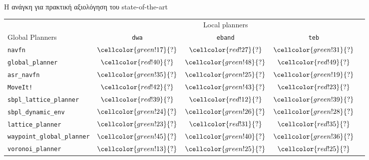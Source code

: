 \begin{frame}{Η ανάγκη για πρακτική αξιολόγηση του state-of-the-art}
{\footnotesize
\begin{table}[h]
\begin{tabular}{lcccc}
  & \multicolumn{3}{c}{Local planners} \\
  \cline{2-4}
  Global Planners                     & \texttt{dwa}                               & \texttt{eband}                             & \texttt{teb} \\ \toprule
  \texttt{navfn}                     & $\cellcolor{green!17}{?}$         & $\cellcolor{red!27}{?}$            & $\cellcolor{green!31}{?}$         \\
  \texttt{global\_planner}           & $\cellcolor{red!40}{?}$         & $\cellcolor{green!48}{?}$            & $\cellcolor{red!49}{?}$         \\
  \texttt{asr\_navfn}                & $\cellcolor{green!35}{?}$         & $\cellcolor{green!25}{?}$            & $\cellcolor{green!19}{?}$         \\
  \texttt{MoveIt!}                   & $\cellcolor{red!42}{?}$         & $\cellcolor{green!43}{?}$            & $\cellcolor{red!23}{?}$         \\
  \texttt{sbpl\_lattice\_planner}    & $\cellcolor{red!39}{?}$         & $\cellcolor{red!12}{?}$            & $\cellcolor{green!39}{?}$         \\
  \texttt{sbpl\_dynamic\_env}        & $\cellcolor{green!24}{?}$         & $\cellcolor{green!26}{?}$            & $\cellcolor{green!28}{?}$         \\
  \texttt{lattice\_planner}          & $\cellcolor{green!23}{?}$         & $\cellcolor{red!31}{?}$            & $\cellcolor{red!35}{?}$         \\
  \texttt{waypoint\_global\_planner} & $\cellcolor{green!45}{?}$         & $\cellcolor{green!40}{?}$            & $\cellcolor{green!36}{?}$         \\
  \texttt{voronoi\_planner}          & $\cellcolor{green!13}{?}$         & $\cellcolor{green!25}{?}$            & $\cellcolor{red!25}{?}$         \\ \bottomrule
\end{tabular}
\end{table}
}

\end{frame}

